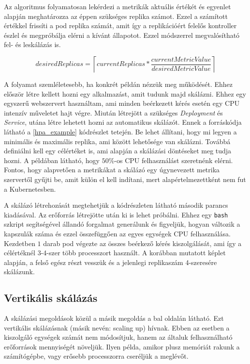 Az algoritmus folyamatosan lekérdezi a metrikák aktuális értékét és  egyenlet alapján meghatározza az éppen szükséges replika számot. Ezzel a számított értékkel frissíti a pod replika számát, amit így a replikációért felelős kontroller észlel és megpróbálja elérni a kívánt állapotot. Ezzel módszerrel megvalósítható fel- és leskálázás is.

\begin{equation}
\label{hpa_algo}
desiredReplicas = \left\lceil currentReplicas * \frac{currentMetricValue}{desiredMetricValue} \right\rceil
\end{equation}

A folyamat szemléletesebb, ha konkrét példán nézzük meg működését.
Ehhez először létre kellett hozni egy alkalmazást, amit tudunk majd skálázni.
Ehhez egy egyszerű webszervert használtam, ami minden beérkezett kérés esetén egy CPU intenzív műveletet hajt végre. 
Miután létrejött a szükséges \textit{Deployment} és \textit{Service}, utána létre lehetett hozni az automatikus skálázót.
Ennek a forráskódja látható a \ref{hpa_example} kódrészlet tetején.
Be lehet állítani, hogy mi legyen a minimális és maximális replika, ami között lehetősége van skálázni. 
Továbbá definiálni kell egy célértéket is, ami alapján a skálázási döntéseket meg tudja hozni.
A példában látható, hogy $50\%$-os CPU felhasználást szeretnénk elérni.
Fontos, hogy alapvetően a metrikákat a skálázó egy úgynevezett metrika szervertől gyűjti be, amit külön el kell indítani, mert alapértelmezettként nem fut a Kubernetesben.

A skálázó létrehozását megtehetjük a kódrészleten látható második parancs kiadásával.
Az erőforrás létrejötte után ki is lehet próbálni.
Ehhez egy \verb+bash+ szkript segítségével állandó forgalmat generálunk és figyeljük, hogyan változik a kapszulák száma és ezzel összefüggően az egyes egységek CPU felhasználása.
Kezdetben $1$ darab pod végezte az összes beérkező kérés kiszolgálását, ami így a célértéknél 3-4-szer több processzort használt.
A korábban mutatott képlet alapján, a felső egész részt vesszük és a jelenlegi replikaszám 4-szeresére skálázunk. \\
 
\lstset{caption=Automatikus horizontális skálázás folyamata, label=hpa_example}



\subsection{Vertikális skálázás}
A skálázási megoldások közül a másik megoldás a  bal oldalán látható. 
Ezt vertikális skálázásnak (másik nevén: scaling up) hívnak. 
Ebben az esetben a kiszolgáló egységek számát nem módosítjuk, hanem az általuk felhasználható erőforrások mennyiségét növeljük.
Ilyen példa, amikor plusz memóriát rakunk a számítógépbe, vagy erősebb processzorra cseréljük a meglévőt. 

